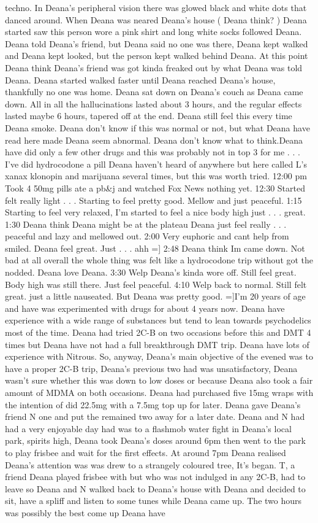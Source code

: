 \documentclass[12pt]{book}
\begin{document}
techno. In Deana's peripheral vision there was glowed black and white dots that danced around. When Deana was neared Deana's house ( Deana think? ) Deana started saw this person wore a pink shirt and long white socks followed Deana. Deana told Deana's friend, but Deana said no one was there, Deana kept walked and Deana kept looked, but the person kept walked behind Deana. At this point Deana think Deana's friend was got kinda freaked out by what Deana was told Deana. Deana started walked faster until Deana reached Deana's house, thankfully no one was home. Deana sat down on Deana's couch as Deana came down. All in all the hallucinations lasted about 3 hours, and the regular effects lasted maybe 6 hours, tapered off at the end. Deana still feel this every time Deana smoke. Deana don't know if this was normal or not, but what Deana have read here made Deana seem abnormal. Deana don't know what to think.Deana have did only a few other drugs and this was probably not in top 3 for me . . .  I've did hydrocodone a pill Deana haven't heard of anywhere but here called L's xanax klonopin and marijuana several times, but this was worth tried. 12:00 pm Took 4 50mg pills ate a pb\&j and watched Fox News nothing yet. 12:30 Started felt really light . . .  Starting to feel pretty good. Mellow and just peaceful. 1:15 Starting to feel very relaxed, I'm started to feel a nice body high just . . .  great. 1:30 Deana think Deana might be at the plateau Deana just feel really . . .  peaceful and lazy and mellowed out. 2:00 Very euphoric and cant help from smiled. Deana feel great. Just . . .  ahh =] 2:48 Deana think Im came down. Not bad at all overall the whole thing was felt like a hydrocodone trip without got the nodded. Deana love Deana. 3:30 Welp Deana's kinda wore off. Still feel great. Body high was still there. Just feel peaceful. 4:10 Welp back to normal. Still felt great. just a little nauseated. But Deana was pretty good. =]I'm 20 years of age and have was experimented with drugs for about 4 years now. Deana have experience with a wide range of substances but tend to lean towards psychodelics most of the time. Deana had tried 2C-B on two occasions before this and DMT 4 times but Deana have not had a full breakthrough DMT trip. Deana have lots of experience with Nitrous. So, anyway, Deana's main objective of the evened was to have a proper 2C-B trip, Deana's previous two had was unsatisfactory, Deana wasn't sure whether this was down to low doses or because Deana also took a fair amount of MDMA on both occasions. Deana had purchased five 15mg wraps with the intention of did 22.5mg with a 7.5mg top up for later. Deana gave Deana's friend N one and put the remained two away for a later date. Deana and N had had a very enjoyable day had was to a flashmob water fight in Deana's local park, spirits high, Deana took Deana's doses around 6pm then went to the park to play frisbee and wait for the first effects. At around 7pm Deana realised Deana's attention was was drew to a strangely coloured tree, It's began. T, a friend Deana played frisbee with but who was not indulged in any 2C-B, had to leave so Deana and N walked back to Deana's house with Deana and decided to sit, have a spliff and listen to some tunes while Deana came up. The two hours was possibly the best come up Deana have 
\end{document}
